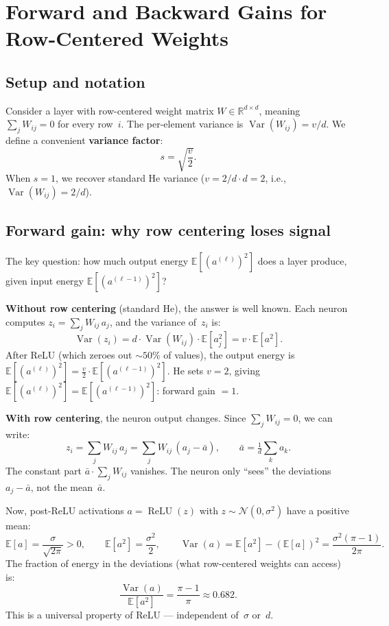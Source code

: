 \documentclass[11pt,a4paper]{article}
\theoremstyle{definition}
\newcommand{\R}{\mathbb{R}}
\newcommand{\E}{\mathbb{E}}
\newcommand{\Var}{\operatorname{Var}}
\newcommand{\relu}{\operatorname{ReLU}}
\begin{document}
\section{Forward and Backward Gains for Row-Centered Weights}
\label{sec:gains}

\subsection{Setup and notation}

Consider a layer with row-centered weight matrix $W \in \R^{d \times d}$,
meaning $\sum_j W_{ij} = 0$ for every row~$i$.  The per-element variance
is $\Var(W_{ij}) = v/d$.  We define a convenient \textbf{variance factor}:
\begin{equation}\label{eq:s-def}
  s = \sqrt{\frac{v}{2}}.
\end{equation}
When $s = 1$, we recover standard He variance ($v = 2/d \cdot d = 2$, i.e., $\Var(W_{ij}) = 2/d$).

\subsection{Forward gain: why row centering loses signal}
\label{sec:fwd-derivation}

The key question: how much output energy $\E[(a^{(\ell)})^2]$ does a
layer produce, given input energy $\E[(a^{(\ell-1)})^2]$?

\textbf{Without row centering} (standard He), the answer is well known.
Each neuron computes $z_i = \sum_j W_{ij}\,a_j$, and the variance of~$z_i$ is:
\[
  \Var(z_i) = d \cdot \Var(W_{ij}) \cdot \E[a_j^2] = v \cdot \E[a^2].
\]
After ReLU (which zeroes out $\sim\!50\%$ of values), the output energy is
$\E[(a^{(\ell)})^2] = \frac{v}{2} \cdot \E[(a^{(\ell-1)})^2]$.
He sets $v = 2$, giving $\E[(a^{(\ell)})^2] = \E[(a^{(\ell-1)})^2]$: forward gain $= 1$.

\textbf{With row centering}, the neuron output changes.
Since $\sum_j W_{ij} = 0$, we can write:
\[
  z_i = \sum_j W_{ij}\,a_j = \sum_j W_{ij}\,(a_j - \bar{a}),
  \qquad \bar{a} = \tfrac{1}{d}\sum_k a_k.
\]
The constant part $\bar{a} \cdot \sum_j W_{ij}$ vanishes.  The neuron only
``sees'' the deviations $a_j - \bar{a}$, not the mean~$\bar{a}$.

Now, post-ReLU activations $a = \relu(z)$ with $z \sim \mathcal{N}(0, \sigma^2)$
have a positive mean:
\[
  \E[a] = \frac{\sigma}{\sqrt{2\pi}} > 0, \qquad
  \E[a^2] = \frac{\sigma^2}{2}, \qquad
  \Var(a) = \E[a^2] - (\E[a])^2 = \frac{\sigma^2(\pi-1)}{2\pi}.
\]
The fraction of energy in the deviations (what row-centered weights can access) is:
\begin{equation}\label{eq:centering-ratio}
  \frac{\Var(a)}{\E[a^2]} = \frac{\pi-1}{\pi} \approx 0.682.
\end{equation}
This is a universal property of ReLU --- independent of~$\sigma$ or~$d$.
\end{document}

